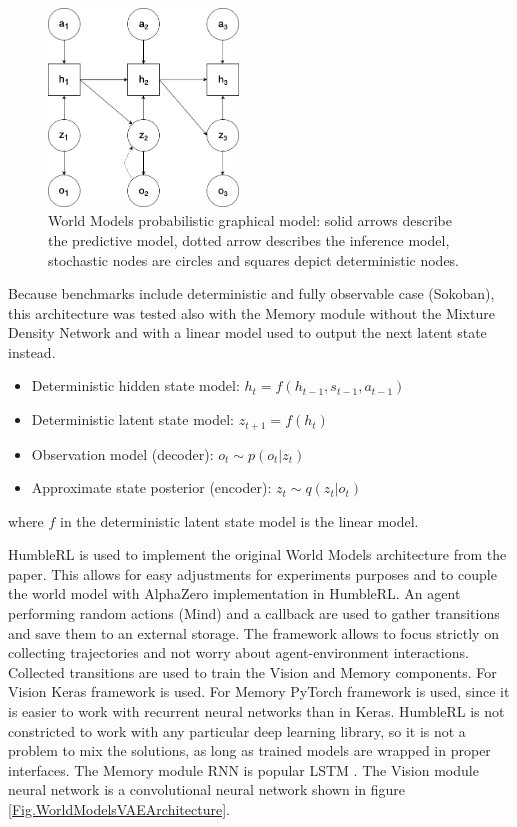 \begin{figure}[H]
\includegraphics[width=0.45\textwidth,keepaspectratio]{figures/WorldModels/prob_graph_model.png}
\caption[World Models probabilistic graphical model]{World Models probabilistic graphical model: solid arrows describe the predictive model, dotted arrow describes the inference model, stochastic nodes are circles and squares depict deterministic nodes.}
\label{Fig.WorldModelsPHM}
\end{figure}

Because benchmarks include deterministic and fully observable case (Sokoban), this architecture was tested also with the Memory module without the Mixture Density Network and with a linear model used to output the next latent state instead.
\begin{itemize}
\item Deterministic hidden state model:      $h_t = f(h_{t-1}, s_{t-1}, a_{t-1})$
\item Deterministic latent state model:      $z_{t+1} = f(h_t)$
\item Observation model (decoder):           $o_t \sim p(o_t|z_t)$
\item Approximate state posterior (encoder): $z_t \sim q(z_t|o_t)$
\end{itemize}
where $f$ in the deterministic latent state model is the linear model.

HumbleRL is used to implement the original World Models architecture from the paper. This allows for easy adjustments for experiments purposes and to couple the world model with AlphaZero implementation in HumbleRL. An agent performing random actions (Mind) and a callback are used to gather transitions and save them to an external storage. The framework allows to focus strictly on collecting trajectories and not worry about agent-environment interactions.
Collected transitions are used to train the Vision and Memory components. For Vision Keras \cite{Code.Keras} framework is used. For Memory PyTorch \cite{Code.PyTorch} framework is used, since it is easier to work with recurrent neural networks than in Keras. HumbleRL is not constricted to work with any particular deep learning library, so it is not a problem to mix the solutions, as long as trained models are wrapped in proper interfaces.
The Memory module RNN is popular LSTM \cite{Algo.LSTM}. The Vision module neural network is a convolutional neural network shown in figure \ref{Fig.WorldModelsVAEArchitecture}.

